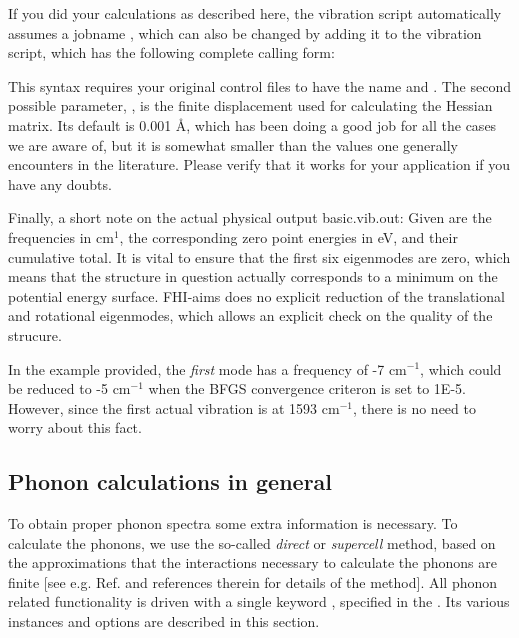 If you did your calculations as described here, the vibration script
automatically assumes a jobname , which can also be
changed by adding it to the vibration script, which has the following
complete calling form:

This syntax requires your original control files to have the
name  and .
The second possible parameter, , is the finite
displacement used for calculating the Hessian matrix. Its default is
0.001 \AA, which has been doing a good job for all the cases we are
aware of, but it is somewhat smaller than the values one generally
encounters in the literature. Please verify that it works for your
application if you have any doubts. 

Finally, a short note on the actual physical output basic.vib.out: Given are the
frequencies in cm$^{1}$, the corresponding zero point energies in eV,
and their cumulative total. It is vital to ensure that the first six
eigenmodes are zero, which means that the structure in question
actually corresponds to a minimum on the potential energy surface. 
FHI-aims does no explicit reduction of the translational and
rotational eigenmodes, which allows an explicit check on the quality
of the strucure.

In the example provided, the \emph{first} mode has a frequency of
-7 cm$^{-1}$, which could be reduced to -5 cm$^{-1}$ when the BFGS
convergence criteron is set to 1E-5. However, since the first actual
vibration is at 1593 cm$^{-1}$, there is no need to worry about this
fact. 

\subsection*{Phonon calculations in general}

To obtain proper phonon spectra some extra information is
necessary. To calculate the phonons, we use the so-called
\emph{direct} or \emph{supercell} method, based on the approximations
that the interactions necessary to calculate the phonons are
finite [see e.g. Ref. \cite{Parlinski97} and references therein
for details of the method]. All phonon related functionality is driven
with a single keyword , specified in the
. Its various instances and options are described
in this section. 

